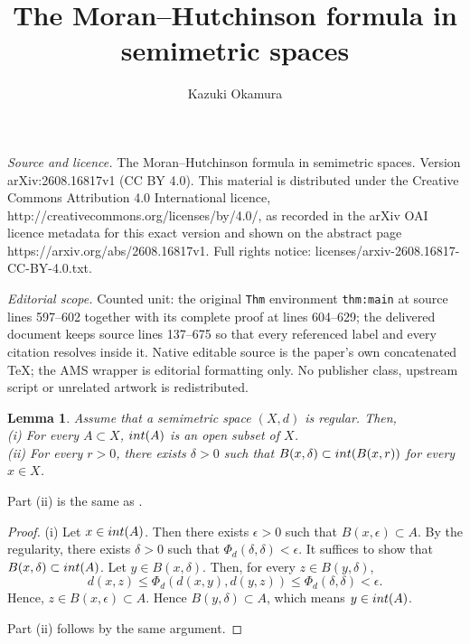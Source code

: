 \documentclass[10pt,a4paper]{amsart}
\newtheorem{Lem}[Thm]{Lemma}
\begin{document}
\title[The Moran--Hutchinson formula in semimetric spaces]{The Moran--Hutchinson formula in semimetric spaces}
\author{Kazuki Okamura}
\date{}
\maketitle
\noindent\emph{Source and licence.} The Moran--Hutchinson formula in semimetric spaces. Version arXiv:2608.16817v1 (CC BY 4.0). This material is distributed under the Creative Commons Attribution 4.0 International licence, http://creativecommons.org/licenses/by/4.0/, as recorded in the arXiv OAI licence metadata for this exact version and shown on the abstract page https://arxiv.org/abs/2608.16817v1. Full rights notice: licenses/arxiv-2608.16817-CC-BY-4.0.txt.\par\smallskip
\noindent\textit{Editorial scope.} Counted unit: the original \texttt{Thm} environment \texttt{thm:main} at source lines 597--602 together with its complete proof at lines 604--629; the delivered document keeps source lines 137--675 so that every referenced label and every citation resolves inside it. Native editable source is the paper's own concatenated TeX; the AMS wrapper is editorial formatting only. No publisher class, upstream script or unrelated artwork is redistributed.
\begin{Lem}\label{lem:interior-open}
Assume that a semimetric space $(X,d)$ is regular. Then,\\
(i) For every $A \subset X$, $\textup{int}(A)$ is an open subset of $X$. \\
(ii) For every $r > 0$, there exists $\delta > 0$ such that $B(x,\delta) \subset \textup{int}(B(x,r))$ for every $x \in X$. 
\end{Lem}

Part (ii) is the same as \cite[Lemma 2]{KocsisPales2022}. 

\begin{proof}
(i) Let $x \in \textup{int}(A)$. 
Then there exists $\epsilon > 0$ such that $B(x,\epsilon) \subset A$. 
By the regularity, there exists $\delta > 0$ such that $\Phi_d (\delta, \delta) < \epsilon$. 
It suffices to show that $B(x,\delta) \subset  \textup{int}(A)$.  
Let $y \in B(x,\delta)$. 
Then, for every $z \in B(y,\delta)$, 
\[ d(x,z) \le \Phi_d (d(x,y), d(y,z)) \le \Phi_d (\delta, \delta) < \epsilon. \]
Hence, $z \in B(x,\epsilon) \subset A$. 
Hence $B(y,\delta) \subset A$, which means $y \in \textup{int}(A)$. 

Part (ii) follows by the same argument. 
\end{proof}
\end{document}
